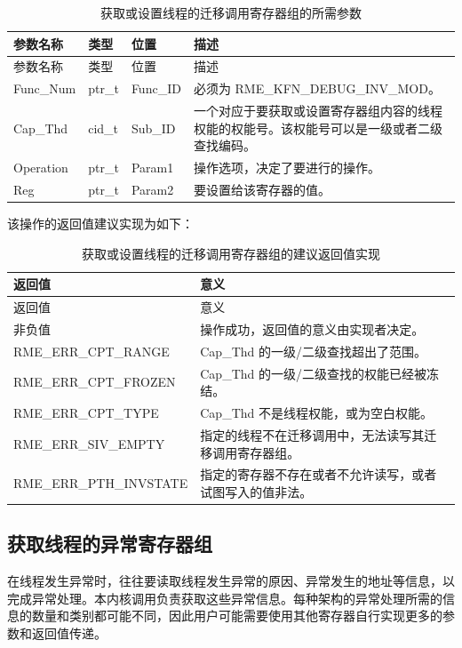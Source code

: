 \begin{xltabular}{\textwidth}{@{}>{\hsize\raggedright\arraybackslash}X>{\hsize\raggedright\arraybackslash}X>{\hsize\raggedright\arraybackslash}X>{\hsize\raggedright\arraybackslash}X@{}}
\caption{获取或设置线程的迁移调用寄存器组的所需参数}\label{tab:8-113-get-or-set-thread-migration-call-register-set-parameters}\\
\toprule
参数名称 & 类型 & 位置 & 描述\tabularnewline
\endfirsthead
\toprule
参数名称 & 类型 & 位置 & 描述\tabularnewline
\midrule
\endhead
\bottomrule
\endlastfoot
Func\_Num & ptr\_t & Func\_ID & 必须为 RME\_KFN\_DEBUG\_INV\_MOD。\tabularnewline
Cap\_Thd & cid\_t & Sub\_ID &
一个对应于要获取或设置寄存器组内容的线程权能的权能号。该权能号可以是一级或者二级查找编码。\tabularnewline
Operation & ptr\_t & Param1 &
操作选项，决定了要进行的操作。\tabularnewline
Reg & ptr\_t & Param2 & 要设置给该寄存器的值。\tabularnewline
\end{xltabular}

该操作的返回值建议实现为如下：

\begin{xltabular}{\textwidth}{@{}>{\hsize\raggedright\arraybackslash}X>{\hsize\raggedright\arraybackslash}X@{}}
\caption{获取或设置线程的迁移调用寄存器组的建议返回值实现}\label{tab:8-114-get-or-set-thread-migration-call-register-set-suggested-return-values}\\
\toprule
返回值 & 意义\tabularnewline
\endfirsthead
\toprule
返回值 & 意义\tabularnewline
\midrule
\endhead
\bottomrule
\endlastfoot
    非负值 & 操作成功，返回值的意义由实现者决定。\tabularnewline
    RME\_ERR\_CPT\_RANGE & Cap\_Thd 的一级/二级查找超出了范围。\tabularnewline
    RME\_ERR\_CPT\_FROZEN & Cap\_Thd 的一级/二级查找的权能已经被冻结。\tabularnewline
    RME\_ERR\_CPT\_TYPE & Cap\_Thd 不是线程权能，或为空白权能。\tabularnewline
    RME\_ERR\_SIV\_EMPTY & 指定的线程不在迁移调用中，无法读写其迁移调用寄存器组。\tabularnewline
    RME\_ERR\_PTH\_INVSTATE & 指定的寄存器不存在或者不允许读写，或者试图写入的值非法。\tabularnewline
\end{xltabular}

\subsection{获取线程的异常寄存器组}\label{subsec:8-get-thread-exception-register-set}

在线程发生异常时，往往要读取线程发生异常的原因、异常发生的地址等信息，以完成异常处理。本内核调用负责获取这些异常信息。每种架构的异常处理所需的信息的数量和类别都可能不同，因此用户可能需要使用其他寄存器自行实现更多的参数和返回值传递。

